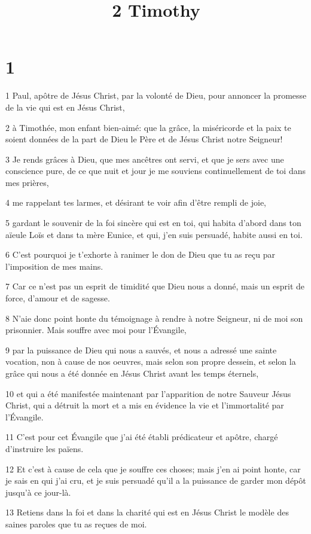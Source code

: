 

\title{2 Timothy}


\chapter{1}

\par 1 Paul, apôtre de Jésus Christ, par la volonté de Dieu, pour annoncer la promesse de la vie qui est en Jésus Christ,
\par 2 à Timothée, mon enfant bien-aimé: que la grâce, la miséricorde et la paix te soient données de la part de Dieu le Père et de Jésus Christ notre Seigneur!
\par 3 Je rends grâces à Dieu, que mes ancêtres ont servi, et que je sers avec une conscience pure, de ce que nuit et jour je me souviens continuellement de toi dans mes prières,
\par 4 me rappelant tes larmes, et désirant te voir afin d'être rempli de joie,
\par 5 gardant le souvenir de la foi sincère qui est en toi, qui habita d'abord dans ton aïeule Loïs et dans ta mère Eunice, et qui, j'en suis persuadé, habite aussi en toi.
\par 6 C'est pourquoi je t'exhorte à ranimer le don de Dieu que tu as reçu par l'imposition de mes mains.
\par 7 Car ce n'est pas un esprit de timidité que Dieu nous a donné, mais un esprit de force, d'amour et de sagesse.
\par 8 N'aie donc point honte du témoignage à rendre à notre Seigneur, ni de moi son prisonnier. Mais souffre avec moi pour l'Évangile,
\par 9 par la puissance de Dieu qui nous a sauvés, et nous a adressé une sainte vocation, non à cause de nos oeuvres, mais selon son propre dessein, et selon la grâce qui nous a été donnée en Jésus Christ avant les temps éternels,
\par 10 et qui a été manifestée maintenant par l'apparition de notre Sauveur Jésus Christ, qui a détruit la mort et a mis en évidence la vie et l'immortalité par l'Évangile.
\par 11 C'est pour cet Évangile que j'ai été établi prédicateur et apôtre, chargé d'instruire les païens.
\par 12 Et c'est à cause de cela que je souffre ces choses; mais j'en ai point honte, car je sais en qui j'ai cru, et je suis persuadé qu'il a la puissance de garder mon dépôt jusqu'à ce jour-là.
\par 13 Retiens dans la foi et dans la charité qui est en Jésus Christ le modèle des saines paroles que tu as reçues de moi.

